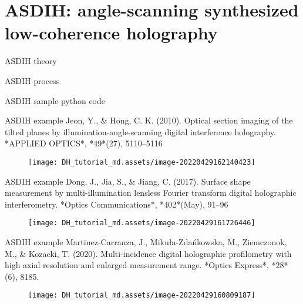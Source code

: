 \documentclass[t, aspectratio=169]{beamer}
\begin{document}
\section{ASDIH: angle-scanning synthesized low-coherence holography}
\begin{frame}[c]
\centering\LARGE\textbf{\secname}
\end{frame}



\begin{frame}{ASDIH theory}

\end{frame}


\begin{frame}{ASDIH process}

\end{frame}


\begin{frame}{ASDIH sample python code}

\end{frame}


\begin{frame}{ASDIH example}
Jeon, Y., \& Hong, C. K. (2010). Optical section imaging of the tilted planes by illumination-angle-scanning digital interference holography. *APPLIED OPTICS*, *49*(27), 5110–5116
\begin{figure}
	\texttt{[image: DH\_tutorial\_md.assets/image-20220429162140423]}
\end{figure}
\end{frame}


\begin{frame}{ASDIH example}
Dong, J., Jia, S., \& Jiang, C. (2017). Surface shape measurement by multi-illumination lensless Fourier transform digital holographic interferometry. *Optics Communications*, *402*(May), 91–96
\begin{figure}
	\texttt{[image: DH\_tutorial\_md.assets/image-20220429161726446]}
\end{figure}
\end{frame}


\begin{frame}{ASDIH example}
Martinez-Carranza, J., Mikuła-Zdańkowska, M., Ziemczonok, M., \& Kozacki, T. (2020). Multi-incidence digital holographic profilometry with high axial resolution and enlarged measurement range. *Optics Express*, *28*(6), 8185.
\begin{figure}
	\texttt{[image: DH\_tutorial\_md.assets/image-20220429160809187]}
\end{figure}
\end{frame}
\end{document}
